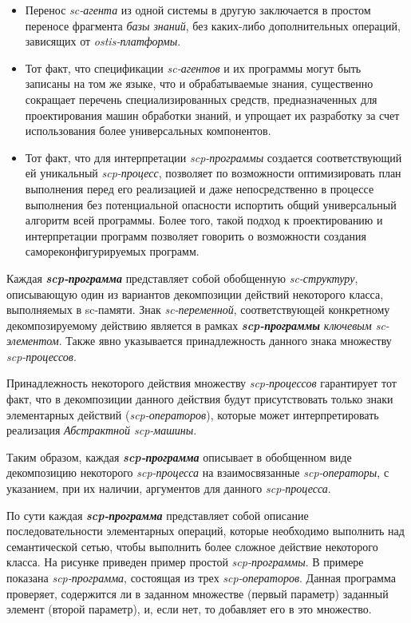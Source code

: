 \begin{frame}{}
\vspace{30pt}
\begin{itemize}
    \item Перенос \textit{sc-агента} из одной системы в другую заключается в простом переносе фрагмента \textit{базы знаний}, без каких-либо дополнительных операций, зависящих от \textit{ostis-платформы}.
	\item Тот факт, что спецификации \textit{sc-агентов} и их программы могут быть записаны на том же языке, что и обрабатываемые знания, существенно сокращает перечень специализированных средств, предназначенных для проектирования машин обработки знаний, и упрощает их разработку за счет использования более универсальных компонентов.
	\item Тот факт, что для интерпретации \textit{scp-программы} создается соответствующий ей уникальный \textit{\mbox{scp-процесс}}, позволяет по возможности оптимизировать план выполнения перед его реализацией и даже непосредственно в процессе выполнения без потенциальной опасности испортить общий универсальный алгоритм всей программы. Более того, такой подход к проектированию и интерпретации программ позволяет говорить о возможности создания самореконфигурируемых программ.
\end{itemize}
\end{frame}

\begin{frame}{}
Каждая \textbf{\textit{scp-программа}} представляет собой обобщенную \textit{sc-структуру}, описывающую один из вариантов декомпозиции действий некоторого класса, выполняемых в sc-памяти. Знак \textit{sc-переменной}, соответствующей конкретному декомпозируемому действию является в рамках \textbf{\textit{scp-программы}} \textit{ключевым sc-элементом\scnrolesign}. Также явно указывается принадлежность данного знака множеству \textit{scp-процессов}.
	
Принадлежность некоторого действия множеству \textit{scp-процессов} гарантирует тот факт, что в декомпозиции данного действия будут присутствовать только знаки элементарных действий (\textit{scp-операторов}), которые может интерпретировать реализация \textit{Абстрактной scp-машины}.
\end{frame}

\begin{frame}{}
Таким образом, каждая \textbf{\textit{scp-программа}} описывает в обобщенном виде декомпозицию некоторого \textit{\mbox{scp-процесса}} на взаимосвязанные \textit{scp-операторы}, с указанием, при их наличии, аргументов для данного \textit{scp-процесса}.

По сути каждая \textbf{\textit{scp-программа}} представляет собой описание последовательности элементарных операций, которые необходимо выполнить над семантической сетью, чтобы выполнить более сложное действие некоторого класса.
На рисунке приведен пример простой \textit{scp-программы}. В примере показана \textit{scp-программа}, состоящая из трех \textit{scp-операторов}. Данная программа проверяет, содержится ли в заданном множестве (первый параметр) заданный элемент (второй параметр), и, если нет, то добавляет его в это множество.
\end{frame}

